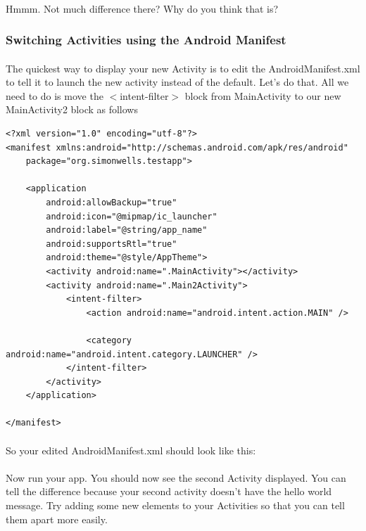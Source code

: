 \paragraph{} Hmmm. Not much difference there? Why do you think that is?

\subsubsection{Switching Activities using the Android Manifest}

\paragraph{} The quickest way to display your new Activity is to edit the AndroidManifest.xml to tell it to launch the new activity instead of the default. Let's do that. All we need to do is move the $<$intent-filter$>$ block from MainActivity to our new MainActivity2 block as follows
\begin{lstlisting}
<?xml version="1.0" encoding="utf-8"?>
<manifest xmlns:android="http://schemas.android.com/apk/res/android"
    package="org.simonwells.testapp">

    <application
        android:allowBackup="true"
        android:icon="@mipmap/ic_launcher"
        android:label="@string/app_name"
        android:supportsRtl="true"
        android:theme="@style/AppTheme">
        <activity android:name=".MainActivity"></activity>
        <activity android:name=".Main2Activity">
            <intent-filter>
                <action android:name="android.intent.action.MAIN" />

                <category android:name="android.intent.category.LAUNCHER" />
            </intent-filter>
        </activity>
    </application>

</manifest>
\end{lstlisting}

\paragraph{} So your edited AndroidManifest.xml should look like this:

\paragraph{} Now run your app. You should now see the second Activity displayed. You can tell the difference because your second activity doesn't have the hello world message. Try adding some new elements to your Activities so that you can tell them apart more easily.

